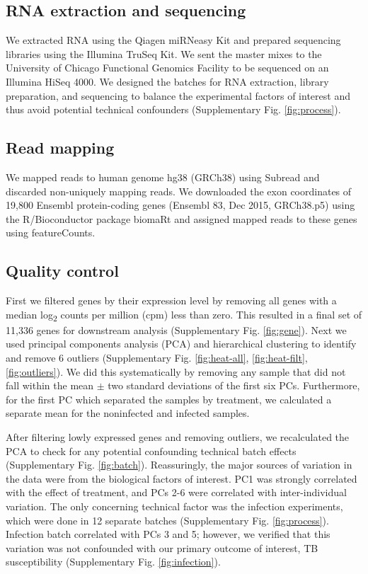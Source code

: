 \documentclass[fleqn,10pt]{wlscirep}
\begin{document}
\subsection*{RNA extraction and sequencing}

We extracted RNA using the Qiagen miRNeasy Kit and prepared sequencing
libraries using the Illumina TruSeq Kit. We sent the master mixes to
the University of Chicago Functional Genomics Facility to be sequenced
on an Illumina HiSeq 4000. We designed the batches for RNA extraction,
library preparation, and sequencing to balance the experimental
factors of interest and thus avoid potential technical confounders
(Supplementary Fig. \ref{fig:process}).
\subsection*{Read mapping}

We mapped reads to human genome hg38 (GRCh38) using Subread and
discarded non-uniquely mapping reads. We downloaded the exon
coordinates of 19,800 Ensembl protein-coding genes (Ensembl 83, Dec
2015, GRCh38.p5) using the R/Bioconductor package biomaRt and assigned
mapped reads to these genes using featureCounts.
\subsection*{Quality control}

First we filtered genes by their expression level by removing all
genes with a median log\textsubscript{2} counts per million (cpm) less
than zero. This resulted in a final set of 11,336 genes for downstream
analysis (Supplementary Fig. \ref{fig:gene}). Next we used principal
components analysis (PCA) and hierarchical clustering to identify and
remove 6 outliers (Supplementary Fig. \ref{fig:heat-all},
\ref{fig:heat-filt}, \ref{fig:outliers}). We did this systematically
by removing any sample that did not fall within the mean $\pm$ two
standard deviations of the first six PCs. Furthermore, for the first
PC which separated the samples by treatment, we calculated a separate
mean for the noninfected and infected samples.

After filtering lowly expressed genes and removing outliers, we
recalculated the PCA to check for any potential confounding technical
batch effects (Supplementary Fig. \ref{fig:batch}). Reassuringly, the
major sources of variation in the data were from the biological
factors of interest. PC1 was strongly correlated with the effect of
treatment, and PCs 2-6 were correlated with inter-individual
variation. The only concerning technical factor was the infection
experiments, which were done in 12 separate batches (Supplementary
Fig. \ref{fig:process}). Infection batch correlated with PCs 3 and 5;
however, we verified that this variation was not confounded with our
primary outcome of interest, TB susceptibility (Supplementary Fig.
\ref{fig:infection}).
\end{document}
